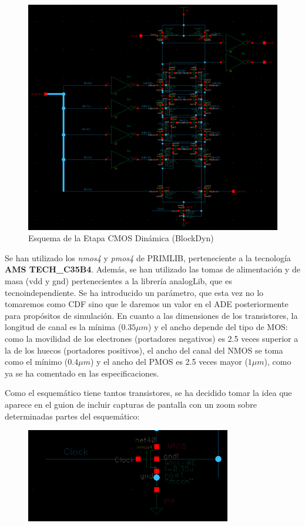 \begin{figure}[h]%
\begin {center}
\includegraphics[width=1\textwidth]{figures/BlockDynSchem.PNG}
\caption{Esquema de la Etapa CMOS Dinámica (BlockDyn)}
\label{fig:BlockDynSchem}
\end {center}
\end{figure}
Se han utilizado los \textit{nmos4} y \textit{pmos4} de PRIMLIB, perteneciente a la tecnología \textbf{AMS TECH\_C35B4}. Además, se han utilizado las tomas de alimentación y de masa (vdd y gnd) pertenecientes a la librería analogLib, que es tecnoindependiente. \newline
Se ha introducido un parámetro, que esta vez no lo tomaremos como CDF sino que le daremos un valor en el ADE posteriormente para propósitos de simulación.
En cuanto a las dimensiones de los transistores, la longitud de canal es la mínima ($0.35\mu m$) y el ancho depende del tipo de MOS: como la movilidad de los electrones (portadores negativos) es 2.5 veces superior a la de los huecos (portadores positivos), el ancho del canal del NMOS se toma como el mínimo ($0.4\mu m$) y el ancho del PMOS es 2.5 veces mayor ($1\mu m$), como ya se ha comentado en las especificaciones.
\par Como el esquemático tiene tantos transistores, se ha decidido tomar la idea que aparece en el guion de incluir capturas de pantalla con un zoom sobre determinadas partes del esquemático:
\begin{figure}[h]%
\begin{center}
\includegraphics[width=0.8\textwidth]{figures/DeatilNMOS.PNG}
\label{fig:CDF}
\end{center}
\end{figure}
